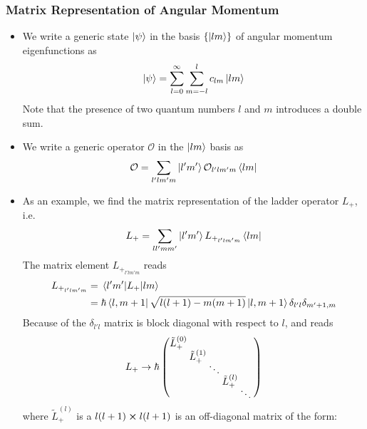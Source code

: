 \documentclass[11pt, a4paper]{article}
\renewcommand{\t}[1]{\tilde{#1}}
\renewcommand{\O}{\mathcal{O}}  %
\newcommand{\p}{\psi}  %
\renewcommand{\b}[1]{\bra{#1}}
\renewcommand{\k}[1]{\ket{#1}}
\begin{document}
\subsubsection{Matrix Representation of Angular Momentum}
\begin{itemize}
	\item We write a generic state $ \ket{\p} $ in the basis $ \{\ket{lm}\} $ of angular momentum eigenfunctions as
	\begin{equation*}
		\k{\p} = \sum_{l = 0}^{\infty}\sum_{m=-l}^{l}c_{lm}\ket{lm}
	\end{equation*}
	Note that the presence of two quantum numbers $ l $ and $ m $ introduces a double sum.
	
	\item We write a generic operator $ \O $ in the $ \k{lm} $ basis as
	\begin{equation*}
		\O = \sum_{l'lm'm}\k{l'm'}\O_{l'lm'm}\bra{lm}
	\end{equation*}
	
	\iffalse
	
	\item As an example, we find the matrix representation of the ladder operator $ L_{+} $, i.e.
	\begin{equation*}
		L_{+} = \sum_{ll'mm'}\k{l'm'}L_{+_{l'lm'm}}\bra{lm}
	\end{equation*}
	The matrix element $ L_{+_{l'lm'm}} $ reads
	\begin{align*}
		L_{+_{l'lm'm}} &= \mel{l'm'}{L_{+}}{lm}\\
		& = \hbar \b{l, m+1}\sqrt{l (l+1) - m(m+1)}\k{l, m+1}\delta_{l'l}\delta_{m'+1,m}
	\end{align*}
	Because of the $ \delta_{l'l} $ matrix is block diagonal with respect to $ l $, and reads
	\begin{equation*}
	\begingroup
	\setlength\arraycolsep{1.0pt}
	\renewcommand*{\arraystretch}{0}
		L_{+} \to \hbar
		\begin{pmatrix}
		 \t{L}_{+}^{(0)}   & & & & \\
		 & \t{L}_{+}^{(1)}   & & & \\[-0.4em]
		 & & \ddots           & & \\
		 & & & \t{L}_{+}^{(l)}   & \\[-0.4em]
		 & & & & \ddots         & \\
		\end{pmatrix}
	\endgroup
	\end{equation*}
	where $ \t{L}_{+}^{(l)} $ is a $ l(l+1) \cross l(l+1) $ is an off-diagonal matrix of the form: 
	

\end{itemize}
\end{document}
